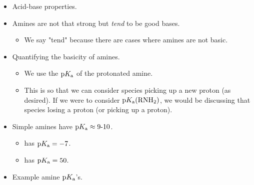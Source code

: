 \documentclass[../notes.tex]{subfiles}
\begin{document}
\begin{itemize}
    \begin{itemize}
        \item Chirality cannot be stabily maintained.
        \item For the umbrealla flip, $E_a=\SI{6}{\kilo\calorie\per\mole}$.
        \begin{itemize}
            \item Recall that this is very much on the same order of magnitude as rotation from eclipsed to staggered to eclipsed in ethane (that transformation has an activation barrier of about \SI{3}{\kilo\calorie\per\mole}).
            \item Note that any reaction with $E_a<\SI{25}{\kilo\calorie\per\mole}$ can proceed at room temp.
            \item This reaction is far below that barrier, so it proceeds readily. Perhaps we could isolate amines in one conformation at lower temperatures, though?
        \end{itemize}
        \item With all four substitutions different, nitrogen behaves like a carbon and does not stereoinvert.
    \end{itemize}
    \item Acid-base properties.
    \item Amines are not that strong but \emph{tend} to be good bases.
    \begin{itemize}
        \item We say "tend" because there are cases where amines are not basic.
    \end{itemize}
    \item Quantifying the basicity of amines.
    \begin{itemize}
        \item We use the $\text{p}K_\text{a}$ of the protonated amine.
        \item This is so that we can consider  species picking up a new proton (as desired). If we were to consider $\pKa(\ce{RNH2})$, we would be discussing that species losing a proton (or  picking up a proton).
    \end{itemize}
    \item Simple amines have $\text{p}K_\text{a}\approx 9\text{-}10$.
    \begin{itemize}
        \item {} has $\text{p}K_\text{a}=-7$.
        \item {} has $\text{p}K_\text{a}=50$.
    \end{itemize}
    \item Example amine $\text{p}K_\text{a}$'s.

\end{itemize}
\end{document}
